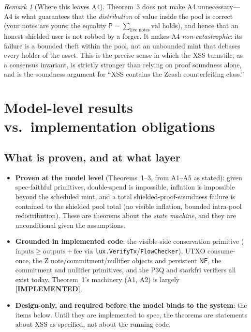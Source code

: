 \documentclass[11pt]{article}
\theoremstyle{definition}
\theoremstyle{remark}
\newtheorem{remark}{Remark}
\newcommand{\IMPL}{\textbf{[IMPLEMENTED]}}
\newcommand{\pool}{\mathsf{P}}
\newcommand{\NF}{\mathsf{NF}}
\begin{document}
\begin{remark}[Where this leaves A4]
\label{rem:a4role}
Theorem~3 does not make A4 unnecessary---A4 is what guarantees that the
\emph{distribution} of value inside the pool is correct (your notes are
yours; the equality $\pool=\sum_{\text{live notes}}\mathrm{val}$ holds), and
hence that an honest shielded user is not robbed by a forger. It makes A4
\emph{non-catastrophic}: its failure is a bounded theft within the pool, not
an unbounded mint that debases every holder of the asset. This is the
precise sense in which the XSS turnstile, as a consensus invariant, is
strictly stronger than relying on proof soundness alone, and is the
soundness argument for ``XSS contains the Zcash counterfeiting class.''
\end{remark}

\section{Model-level results vs.\ implementation obligations}
\label{sec:honest}

\subsection{What is proven, and at what layer}

\begin{itemize}[leftmargin=2em]
\item \textbf{Proven at the model level} (Theorems~1--3, from A1--A5 as
  stated): given spec-faithful primitives, double-spend is impossible,
  inflation is impossible beyond the scheduled mint, and a total
  shielded-proof-soundness failure is contained to the shielded pool total
  (no visible inflation, bounded intra-pool redistribution). These are
  theorems about the \emph{state machine}, and they are unconditional given
  the assumptions.
\item \textbf{Grounded in implemented code}: the visible-side conservation
  primitive ($\mathrm{inputs}\ge\mathrm{outputs}+\mathrm{fee}$ via
  \texttt{lux.VerifyTx}/\texttt{FlowChecker}), UTXO consume-once, the Z
  note/commitment/nullifier objects and persistent $\NF$, the commitment
  and nullifier primitives, and the P3Q and starkfri verifiers all exist
  today. Theorem~1's machinery (A1, A2) is largely \IMPL{}.
\item \textbf{Design-only, and required before the model binds to the
  system}: the items below. Until they are implemented to spec, the
  theorems are statements about XSS-as-specified, not about the running
  code.
\end{itemize}
\end{document}
